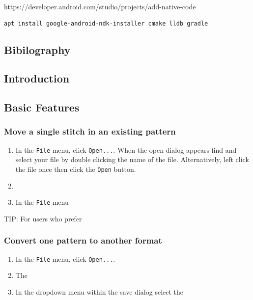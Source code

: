 \documentclass[a4paper, 11pt]{report}
\begin{document}
https://developer.android.com/studio/projects/add-native-code

\begin{verbatim}
apt install google-android-ndk-installer cmake lldb gradle
\end{verbatim}

\hypertarget{bibilography}{%
\subsection{Bibilography}\label{bibilography}}

\hypertarget{introduction-1}{%
\subsection{Introduction}\label{introduction-1}}

\hypertarget{basic-features-1}{%
\subsection{Basic Features}\label{basic-features-1}}

\hypertarget{move-a-single-stitch-in-an-existing-pattern-1}{%
\subsubsection{Move a single stitch in an existing
pattern}\label{move-a-single-stitch-in-an-existing-pattern-1}}

\begin{enumerate}
\def\labelenumi{\arabic{enumi}.}
\item
  In the \texttt{File} menu, click \texttt{Open...}. When the open
  dialog appears find and select your file by double clicking the name
  of the file. Alternatively, left click the file once then click the
  \texttt{Open} button.
\item
\item
  In the \texttt{File} menu
\end{enumerate}

TIP: For users who prefer

\hypertarget{convert-one-pattern-to-another-format-1}{%
\subsubsection{Convert one pattern to another
format}\label{convert-one-pattern-to-another-format-1}}

\begin{enumerate}
\def\labelenumi{\arabic{enumi}.}
\item
  In the \texttt{File} menu, click \texttt{Open...}.
\item
  The
\item
  In the dropdown menu within the save dialog select the
\end{enumerate}
\end{document}
